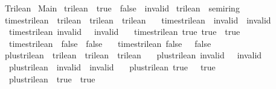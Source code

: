%
\begin{isabellebody}%
%
%
\isadelimtheory
%
\endisadelimtheory
%
\isatagtheory
{}\isamarkupfalse%
\ Trilean\isanewline
{}\ Main\isanewline
{}%
\endisatagtheory
{\isafoldtheory}%
%
\isadelimtheory
\isanewline
%
\endisadelimtheory
\isanewline
{}\isamarkupfalse%
\ trilean\ {\isacharequal}\ true\ {\isacharbar}\ false\ {\isacharbar}\ invalid\isanewline
\isanewline
{}\isamarkupfalse%
\ trilean\ {\isacharcolon}{\isacharcolon}\ semiring\ \isanewline
{}\isamarkupfalse%
\ times{\isacharunderscore}trilean\ {\isacharcolon}{\isacharcolon}\ {\isachardoublequoteopen}trilean\ {\isasymRightarrow}\ trilean\ {\isasymRightarrow}\ trilean{\isachardoublequoteclose}\ \isanewline
\ \ {\isachardoublequoteopen}times{\isacharunderscore}trilean\ {\isacharunderscore}\ invalid\ {\isacharequal}\ invalid{\isachardoublequoteclose}\ {\isacharbar}\isanewline
\ \ {\isachardoublequoteopen}times{\isacharunderscore}trilean\ invalid\ {\isacharunderscore}\ {\isacharequal}\ invalid{\isachardoublequoteclose}\ {\isacharbar}\isanewline
\ \ {\isachardoublequoteopen}times{\isacharunderscore}trilean\ true\ true\ {\isacharequal}\ true{\isachardoublequoteclose}\ {\isacharbar}\isanewline
\ \ {\isachardoublequoteopen}times{\isacharunderscore}trilean\ {\isacharunderscore}\ false\ {\isacharequal}\ false{\isachardoublequoteclose}\ {\isacharbar}\isanewline
\ \ {\isachardoublequoteopen}times{\isacharunderscore}trilean\ false\ {\isacharunderscore}\ {\isacharequal}\ false{\isachardoublequoteclose}\ \isanewline
\isanewline
{}\isamarkupfalse%
\ plus{\isacharunderscore}trilean\ {\isacharcolon}{\isacharcolon}\ {\isachardoublequoteopen}trilean\ {\isasymRightarrow}\ trilean\ {\isasymRightarrow}\ trilean{\isachardoublequoteclose}\ \isanewline
\ \ {\isachardoublequoteopen}plus{\isacharunderscore}trilean\ invalid\ {\isacharunderscore}\ {\isacharequal}\ invalid{\isachardoublequoteclose}\ {\isacharbar}\isanewline
\ \ {\isachardoublequoteopen}plus{\isacharunderscore}trilean\ {\isacharunderscore}\ invalid\ {\isacharequal}\ invalid{\isachardoublequoteclose}\ {\isacharbar}\isanewline
\ \ {\isachardoublequoteopen}plus{\isacharunderscore}trilean\ true\ {\isacharunderscore}\ {\isacharequal}\ true{\isachardoublequoteclose}\ {\isacharbar}\isanewline
\ \ {\isachardoublequoteopen}plus{\isacharunderscore}trilean\ {\isacharunderscore}\ true\ {\isacharequal}\ true{\isachardoublequoteclose}\ {\isacharbar}\isanewline

\end{isabellebody}
